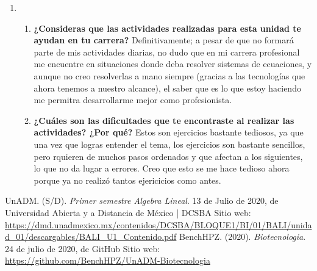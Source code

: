 \documentclass[12pt]{article}
\begin{document}
\begin{enumerate}[\bf{Unidad} 1]
	\item \ \\
		\begin{enumerate}
			\item \textbf{¿Consideras que las actividades realizadas para esta unidad te ayudan en tu carrera?} Definitivamente; a pesar de que no formará parte de mis actividades diarias, no dudo que en mi carrera profesional me encuentre en situaciones donde deba resolver sistemas de ecuaciones, y aunque no creo resolverlas a mano siempre (gracias a las tecnologías que ahora tenemos a nuestro alcance), el saber que es lo que estoy haciendo me permitra desarrollarme mejor como profesionista.
			
			\item \textbf{¿Cuáles son las dificultades que te encontraste al realizar las actividades? ¿Por qué?} Estos son ejercicios bastante tediosos, ya que una vez que logras entender el tema, los ejercicios son bastante sencillos, pero rquieren de muchos pasos ordenados y que afectan a los siguientes, lo que no da lugar a errores. Creo que esto se me hace tedioso ahora porque ya no realizó tantos ejericicios como antes.
			
		\end{enumerate}
\end{enumerate}

\noindent\makebox[\linewidth]{\rule{\paperwidth}{0.4pt}}
\begin{thebibliography}{X}
	 UnADM. (S/D). \textit{Primer semestre Algebra Lineal}. 13 de Julio de 2020, de Universidad Abierta y a Distancia de México | DCSBA Sitio web: \url{https://dmd.unadmexico.mx/contenidos/DCSBA/BLOQUE1/BI/01/BALI/unidad_01/descargables/BALI_U1_Contenido.pdf}
	 BenchHPZ. (2020). \textit{Biotecnologia}. 24 de julio de 2020, de GitHub Sitio web: \url{https://github.com/BenchHPZ/UnADM-Biotecnologia}
\end{thebibliography}
\end{document}
